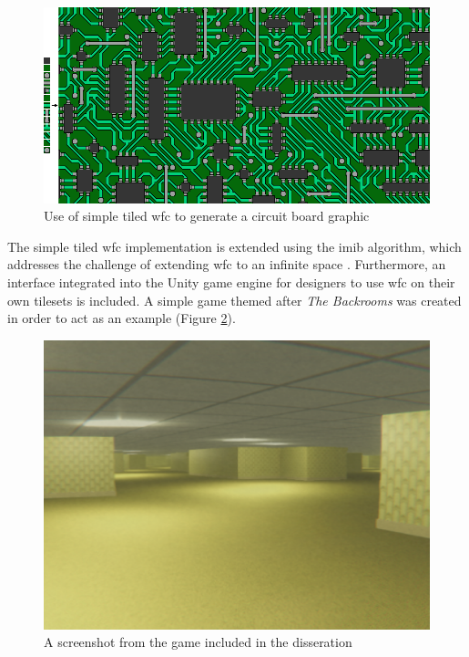 \begin{figure}[H]
    \centering
    \includegraphics[width=\textwidth, height=0.3\textheight, keepaspectratio]{Images/circuit-1.png}
    \caption{Use of simple tiled \acrshort{wfc} to generate a circuit board graphic \cite{Gumin_Wave_Function_Collapse_2016}}
    \label{fig:WFCcircuit}
\end{figure}

The simple tiled \acrshort{wfc} implementation is extended using the \acrfull{imib} algorithm, which addresses the challenge of extending \acrshort{wfc} to an infinite space \cite{Infinite_Modifying_In_Blocks}. Furthermore, an interface integrated into the Unity game engine for designers to use \acrshort{wfc} on their own tilesets is included. A simple game themed after \textit{The Backrooms} was created in order to act as an example (Figure \ref{fig:backroomsInGame}).

\begin{figure}[H]
    \centering
    \includegraphics[width=\textwidth, height=0.4\textheight, keepaspectratio]{Images/Backrooms.png}
    \caption{A screenshot from the game included in the disseration}
    \label{fig:backroomsInGame}
\end{figure}


